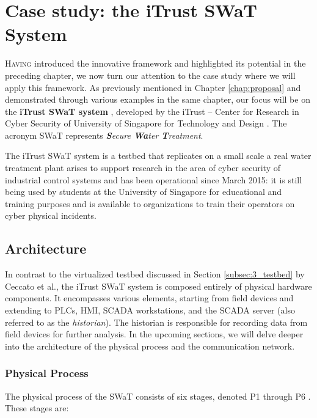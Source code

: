 \chapter{Case study: the iTrust SWaT System}
\label{casestudy}

\linenumbers
\lettrine[lines=2]{H}{aving} introduced the innovative framework and highlighted its potential in the preceding chapter, we now turn our attention to the case study where we will apply this framework. As previously mentioned in Chapter \ref{chap:proposal} and demonstrated through various examples in the same chapter, our focus will be on the \textbf{iTrust SWaT system} \cite{swat_home}, developed by the iTrust -- Center for Research in Cyber Security of University of Singapore for Technology and Design \cite{itrust_site}. The acronym SWaT represents \textit{\textbf{S}ecure \textbf{Wa}ter \textbf{T}reatment}.

\bigskip
The iTrust SWaT system is a testbed that replicates on a small scale a real water treatment plant arises to support research in the area of cyber security of industrial control systems and has been operational since March 2015: it is still being used by students at the University of Singapore for educational and training purposes and is available to organizations to train their operators on cyber physical incidents.

\section{Architecture}
\label{sec:5_swat_architecture}
In contrast to the virtualized testbed discussed in Section \ref{subsec:3_testbed} by Ceccato et al., the iTrust SWaT system is composed entirely of physical hardware components. It encompasses various elements, starting from field devices and extending to PLCs, HMI, SCADA workstations, and the SCADA server (also referred to as the \textit{historian}). The historian is responsible for recording data from field devices for further analysis. In the upcoming sections, we will delve deeper into the architecture of the physical process and the communication network.

\subsection{Physical Process} 
\label{subsec:5_swat_physical_architecture}
The physical process of the SWaT consists of six stages, denoted P1 through P6 \cite{swat_tecnical_pdf}\cite{swat_tippenhauer}. These stages are:

